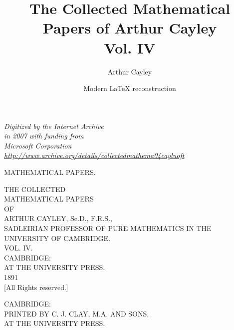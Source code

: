 \documentclass[11pt,a4paper]{book}
\title{The Collected Mathematical Papers of Arthur Cayley\\Vol. IV}
\author{Arthur Cayley}
\date{Modern \LaTeX{} reconstruction}
\begin{document}
\maketitle


\frontmatter

\thispagestyle{empty}
\mbox{}
\newpage
\thispagestyle{empty}
\begin{center}
\textit{Digitized by the Internet Archive\\
in 2007 with funding from\\
Microsoft Corporation\\[1em]
\url{http://www.archive.org/details/collectedmathema04cayluoft}}
\end{center}
\newpage

\thispagestyle{empty}
\begin{center}
\vspace*{2in}
{\large MATHEMATICAL PAPERS.}
\end{center}
\newpage

\thispagestyle{empty}
\mbox{}
\newpage

\thispagestyle{empty}
\begin{center}
\vspace*{1in}
{\LARGE THE COLLECTED}\\[0.5em]
{\LARGE MATHEMATICAL PAPERS}\\[1em]
{\large OF}\\[1em]
{\LARGE ARTHUR CAYLEY, Sc.D., F.R.S.,}\\[0.5em]
{\normalsize SADLEIRIAN PROFESSOR OF PURE MATHEMATICS IN THE UNIVERSITY OF CAMBRIDGE.}\\[2em]
{\Huge VOL. IV.}\\[2em]
{\large CAMBRIDGE:}\\[0.3em]
{\normalsize AT THE UNIVERSITY PRESS.}\\[1em]
{\normalsize 1891}\\[0.5em]
{\small [All Rights reserved.]}
\end{center}
\newpage

\thispagestyle{empty}
\begin{center}
\vspace*{3in}
{\small CAMBRIDGE:}\\[0.3em]
{\small PRINTED BY C. J. CLAY, M.A. AND SONS,}\\[0.3em]
{\small AT THE UNIVERSITY PRESS.}
\end{center}
\newpage
\end{document}
